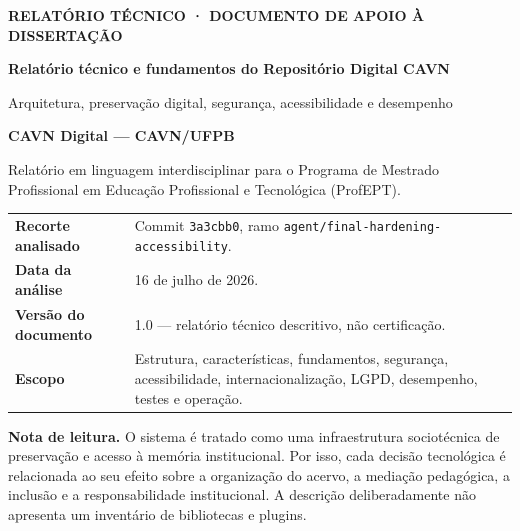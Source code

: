 \documentclass[11pt,a4paper]{article}
\newcommand{\code}[1]{\texttt{#1}}
\begin{document}
\hypersetup{pageanchor=false}
\begin{titlepage}
\thispagestyle{empty}
\begin{tcolorbox}[colback=CavnBlue,colframe=CavnBlue,width=\textwidth,height=6.7cm,valign=center,boxrule=0pt,arc=0mm,left=16pt,right=16pt]
  {\color{CavnGold}\sffamily\bfseries\large RELATÓRIO TÉCNICO · DOCUMENTO DE APOIO À DISSERTAÇÃO}\par\vspace{0.55cm}
  {\color{white}\sffamily\bfseries\fontsize{25}{30}\selectfont Relatório técnico e fundamentos do Repositório Digital CAVN}\par\vspace{0.35cm}
  {\color{white}\sffamily\large Arquitetura, preservação digital, segurança, acessibilidade e desempenho}
\end{tcolorbox}

\vspace{1.1cm}
{\color{CavnBlue}\sffamily\bfseries\Large CAVN Digital — CAVN/UFPB}\par
\vspace{0.3cm}
{\color{CavnMuted}\large Relatório em linguagem interdisciplinar para o Programa de Mestrado Profissional em Educação Profissional e Tecnológica (ProfEPT).}\par

\vfill
\begin{tabular}{@{}P{0.26\textwidth}P{0.66\textwidth}@{}}
  \textbf{Recorte analisado} & Commit \code{3a3cbb0}, ramo \code{agent/final-hardening-accessibility}.\\[4pt]
  \textbf{Data da análise} & 16 de julho de 2026.\\[4pt]
  \textbf{Versão do documento} & 1.0 — relatório técnico descritivo, não certificação.\\[4pt]
  \textbf{Escopo} & Estrutura, características, fundamentos, segurança, acessibilidade, internacionalização, LGPD, desempenho, testes e operação.\\
\end{tabular}

\vfill
\begin{tcolorbox}[colback=CavnLight,colframe=CavnLine]
\textbf{Nota de leitura.} O sistema é tratado como uma infraestrutura sociotécnica de preservação e acesso à memória institucional. Por isso, cada decisão tecnológica é relacionada ao seu efeito sobre a organização do acervo, a mediação pedagógica, a inclusão e a responsabilidade institucional. A descrição deliberadamente não apresenta um inventário de bibliotecas e plugins.
\end{tcolorbox}
\end{titlepage}
\end{document}
